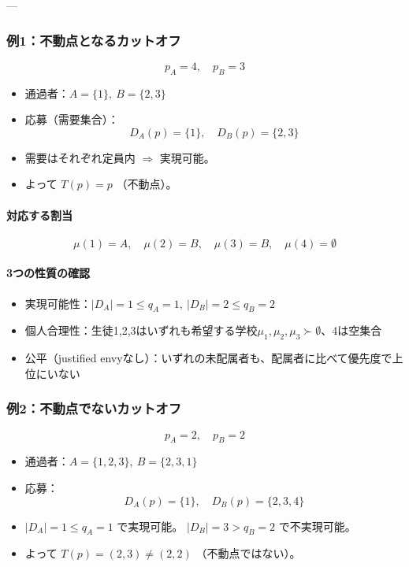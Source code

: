 \documentclass[12pt, a4paper]{article}
\theoremstyle{definition}
\theoremstyle{remark}
\theoremstyle{plain}
\begin{document}
---

\subsubsection*{例1：不動点となるカットオフ}
\[
p_A = 4, \quad p_B = 3
\]

\begin{itemize}
  \item 通過者：$A=\{1\},\ B=\{2,3\}$
  \item 応募（需要集合）：
  \[
    D_A(p)=\{1\},\quad D_B(p)=\{2,3\}
  \]
  \item 需要はそれぞれ定員内 $\Rightarrow$ 実現可能。
  \item よって $T(p)=p$ （不動点）。
\end{itemize}

\paragraph{対応する割当}
\[
\mu(1)=A,\quad \mu(2)=B,\quad \mu(3)=B,\quad \mu(4)=\emptyset
\]

\paragraph{3つの性質の確認}
\begin{itemize}
  \item 実現可能性：$|D_A|=1 \leq q_A=1,\ |D_B|=2 \leq q_B=2$
  \item 個人合理性：生徒1,2,3はいずれも希望する学校$\mu_1,\mu_2,\mu_3 \succ \emptyset$、4は空集合
  \item 公平（justified envyなし）：いずれの未配属者も、配属者に比べて優先度で上位にいない
\end{itemize}



\subsubsection*{例2：不動点でないカットオフ}
\[
p_A = 2, \quad p_B = 2
\]

\begin{itemize}
  \item 通過者：$A=\{1,2,3\},\ B=\{2,3,1\}$
  \item 応募：
  \[
    D_A(p)=\{1\},\quad D_B(p)=\{2,3,4\}
  \]
  \item $|D_A|=1 \leq q_A=1$ で実現可能。  
        $|D_B|=3 > q_B=2$ で不実現可能。
  \item よって $T(p)=(2,3)\neq (2,2)$ （不動点ではない）。
\end{itemize}
\end{document}
